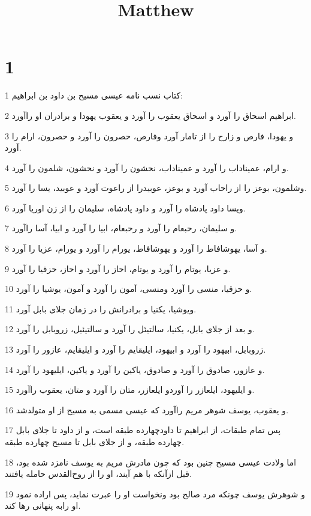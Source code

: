

\title{Matthew}


\chapter{1}

\par 1 کتاب نسب نامه عیسی مسیح بن داود بن ابراهیم:
\par 2 ابراهیم اسحاق را آورد و اسحاق یعقوب را آورد و یعقوب یهودا و برادران او راآورد.
\par 3 و یهودا، فارص و زارح را از تامار آورد وفارص، حصرون را آورد و حصرون، ارام را آورد.
\par 4 و ارام، عمیناداب را آورد و عمیناداب، نحشون را آورد و نحشون، شلمون را آورد.
\par 5 وشلمون، بوعز را از راحاب آورد و بوعز، عوبیدرا از راعوت آورد و عوبید، یسا را آورد.
\par 6 ویسا داود پادشاه را آورد و داود پادشاه، سلیمان را از زن اوریا آورد.
\par 7 و سلیمان، رحبعام را آورد و رحبعام، ابیا را آورد و ابیا، آسا راآورد.
\par 8 و آسا، یهوشافاط را آورد و یهوشافاط، یورام را آورد و یورام، عزیا را آورد.
\par 9 و عزیا، یوتام را آورد و یوتام، احاز را آورد و احاز، حزقیا را آورد.
\par 10 و حزقیا، منسی را آورد ومنسی، آمون را آورد و آمون، یوشیا را آورد.
\par 11 ویوشیا، یکنیا و برادرانش را در زمان جلای بابل آورد.
\par 12 و بعد از جلای بابل، یکنیا، سالتیئل را آورد و سالتیئیل، زروبابل را آورد.
\par 13 زروبابل، ابیهود را آورد و ابیهود، ایلیقایم را آورد و ایلیقایم، عازور را آورد.
\par 14 و عازور، صادوق را آورد و صادوق، یاکین را آورد و یاکین، ایلیهود را آورد.
\par 15 و ایلیهود، ایلعازر را آوردو ایلعازر، متان را آورد و متان، یعقوب راآورد.
\par 16 و یعقوب، یوسف شوهر مریم راآورد که عیسی مسمی به مسیح از او متولدشد.
\par 17 پس تمام طبقات، از ابراهیم تا داودچهارده طبقه است، و از داود تا جلای بابل چهارده طبقه، و از جلای بابل تا مسیح چهارده طبقه.
\par 18 اما ولادت عیسی مسیح چنین بود که چون مادرش مریم به یوسف نامزد شده بود، قبل ازآنکه با هم آیند، او را از روح‌القدس حامله یافتند.
\par 19 و شوهرش یوسف چونکه مرد صالح بود ونخواست او را عبرت نماید، پس اراده نمود او رابه پنهانی رها کند.
